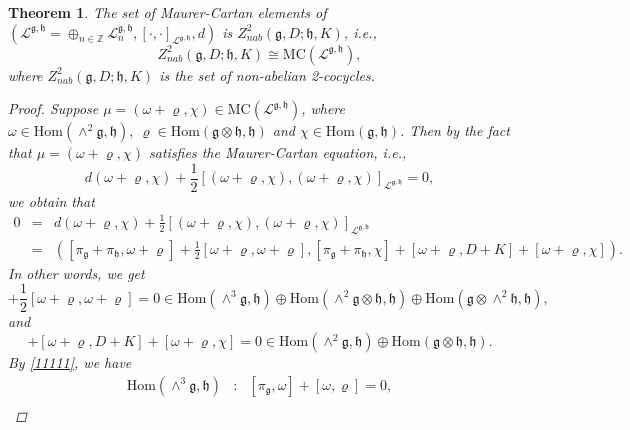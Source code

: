 \documentclass[12pt]{amsart}
\newtheorem{thm}{Theorem}[section]
\newcommand{\g}{\mathfrak g}
\newcommand{\h}{\mathfrak h}
\newcommand{\huaL}{\mathcal{L}}
\newcommand{\Hom}{\mathrm{Hom}}
\begin{document}
\begin{thm}\label{zmc}
The set of {\rm Maurer-Cartan} elements of $(\huaL^{\g, \h}=\oplus_{n\in\mathbb{Z}}\huaL^{\g, \h}_n, [\cdot, \cdot]_{\huaL^{\g, \h}}, d)$ is $Z^{2}_{nab}(\g,D;\h,K)$, i.e.,
    \begin{equation}
        Z^{2}_{nab}(\g,D;\h,K)\cong\mathrm{MC}(\huaL^{\g, \h}),
    \end{equation}
where $Z^{2}_{nab}(\g,D; \h,K)$ is the set of non-abelian 2-cocycles. 
    \begin{proof}
        Suppose $\mu=(\omega+\varrho,\chi)\in \mathrm{MC}(\huaL^{\g, \h})$, where $\omega\in\Hom(\wedge^{2}\g,\h),\ \varrho\in\Hom(\g\otimes\h,\h)$ and $\chi\in\Hom(\g,\h)$. Then by the fact that $\mu=(\omega+\varrho,\chi)$ satisfies the {\rm Maurer-Cartan} equation, i.e.,
        \begin{equation*}
            d(\omega+\varrho,\chi)+\frac{1}{2}[(\omega+\varrho,\chi),(\omega+\varrho,\chi)]_{\huaL^{\g, \h}}=0,
        \end{equation*}
        we obtain that 
        \begin{eqnarray*}
            0&=&d(\omega+\varrho,\chi)+\frac{1}{2}[(\omega+\varrho,\chi),(\omega+\varrho,\chi)]_{\huaL^{\g, \h}}\\
            &=&([\pi_{\g}+\pi_{\h},\omega+\varrho]+\frac{1}{2}[\omega+\varrho,\omega+\varrho],[\pi_{\g}+\pi_{\h},\chi]+[\omega+\varrho,D+K]+[\omega+\varrho,\chi]).
        \end{eqnarray*}
        In other words, we get 
        \begin{equation*}
            [\pi_{\g}+\pi_{\h},\omega+\varrho]+\frac{1}{2}[\omega+\varrho,\omega+\varrho]=0\in\Hom(\wedge^{3}\g,\h)\oplus\Hom(\wedge^{2}\g\otimes\h,\h)\oplus\Hom(\g\otimes\wedge^{2}\h,\h),
        \end{equation*}
        and 
        \begin{equation*}
            [\pi_{\g}+\pi_{\h},\chi]+[\omega+\varrho,D+K]+[\omega+\varrho,\chi]=0\in\Hom(\wedge^{2}\g,\h)\oplus\Hom(\g\otimes\h,\h).
        \end{equation*}
    By \eqref{11111}, we have 
        \begin{eqnarray*}
            \Hom(\wedge^{3}\g,\h)&:&[\pi_{\g},\omega]+[\omega,\varrho]=0,\\

\end{eqnarray*}
\end{proof}
\end{thm}
\end{document}
